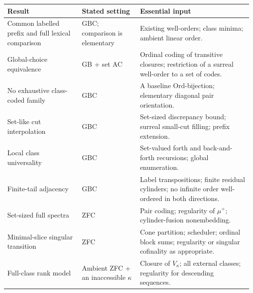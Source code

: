 \documentclass[11pt]{article}
\theoremstyle{definition}
\theoremstyle{remark}
\newcommand{\Ord}{\mathrm{Ord}}
\begin{document}
\begin{longtable}{@{}p{}p{}p{}@{}}
\toprule
Result & Stated setting & Essential input\\
\midrule
\endhead
Common labelled prefix and full lexical comparison & GBC; comparison is
elementary & Existing well-orders; class minima; ambient linear order.\\
Global-choice equivalence & GB + set AC & Ordinal coding of transitive
closures; restriction of a surreal well-order to a set of codes.\\
No exhaustive class-coded family & GBC & A baseline $\Ord$-bijection;
elementary diagonal pair orientation.\\
Set-like cut interpolation & GBC & Set-sized discrepancy bound; surreal
small-cut filling; prefix extension.\\
Local class universality & GBC & Set-valued forth and back-and-forth
recursions; global enumeration.\\
Finite-tail adjacency & GBC & Label transpositions; finite residual
cylinders; no infinite order well-ordered in both directions.\\
Set-sized full spectra & ZFC & Pair coding; regularity of $\mu^+$;
cylinder-fusion nonembedding.\\
Minimal-slice singular transition & ZFC & Cone partition; scheduler;
ordinal block sums; regularity or singular cofinality as appropriate.\\
Full-class rank model & Ambient ZFC + an inaccessible $\kappa$ & Closure
of $V_\kappa$; all external classes; regularity for descending sequences.\\
\bottomrule
\end{longtable}

\end{document}
